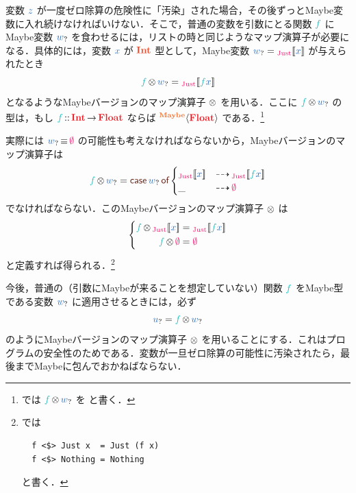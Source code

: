 \documentclass[a5paper,twoside,fleqn,draft]{jsbook}
\begin{document}
変数 $\hVar{z}$ が一度ゼロ除算の危険性に「汚染」された場合，その後ずっとMaybe変数に入れ続けなければいけない．そこで，普通の変数を引数にとる関数 $\hFunc{f}$ にMaybe変数 $\hMaybeVar{w}$ を食わせるには，リストの時と同じようなマップ演算子が必要になる．具体的には，変数 $\hVar{x}$ が $\mType{Int}$ 型として，Maybe変数 $\hMaybeVar{w}=\hJustWith{\hVar{x}}$ が与えられたとき
\begin{equation}
  \hFunc{f}\hFunctorMap\hMaybeVar{w}
  =\hJustWith{\hFunc{f}\hVar{x}}
\end{equation}
となるようなMaybeバージョンのマップ演算子 $\operatorname{\otimes}$ を用いる．ここに $\hFunc{f}\hFunctorMap\hMaybeVar{w}$ の型は，もし $\hFunc{f}\hIsTypeOf\mProjEXP{\hInt}{\hFloat}$ ならば $\hMaybeConstruct{\hFloat}$ である．\footnote{\haskell では $\hFunc{f}\hFunctorMap\hMaybeVar{w}$ を  と書く．}

実際には $\hMaybeVar{w}\hIfEq\hNothing$ の可能性も考えなければならないから，Maybeバージョンのマップ演算子は
\begin{equation}
  \hFunc{f}\hFunctorMap\hMaybeVar{w}
  =\hCaseSyntax{\hMaybeVar{w}}
  \begin{cases}
    \hJustWith{\hVar{x}}
    &\hIfSo\hJustWith{\hFunc{f}\hVar{x}}\\
    \_
    &\hIfSo\hNothing
  \end{cases}
\end{equation}
でなければならない．このMaybeバージョンのマップ演算子 $\operatorname{\otimes}$ は
\begin{equation}
  \left\{
  \begin{aligned}
    \hFunc{f}\hFunctorMap\hJustWith{\hVar{x}}
    &=\hJustWith{\hFunc{f}\hVar{x}}\\
    \hFunc{f}\hFunctorMap\hNothing
    &=\hNothing
  \end{aligned}
  \right.
\end{equation}
と定義すれば得られる．\footnote{\haskell では
\begin{verbatim}
  f <$> Just x  = Just (f x)
  f <$> Nothing = Nothing
\end{verbatim}
と書く．}

今後，普通の（引数にMaybeが来ることを想定していない）関数 $\hFunc{f}$ をMaybe型である変数 $\hMaybeVar{w}$ に適用させるときには，必ず
\begin{equation}
  \hMaybeVar{u}
  =\hFunc{f}\hFunctorMap\hMaybeVar{w}
\end{equation}
のようにMaybeバージョンのマップ演算子 $\operatorname{\otimes}$ を用いることにする．これはプログラムの安全性のためである．変数が一旦ゼロ除算の可能性に汚染されたら，最後までMaybeに包んでおかねばならない．%
\end{document}
